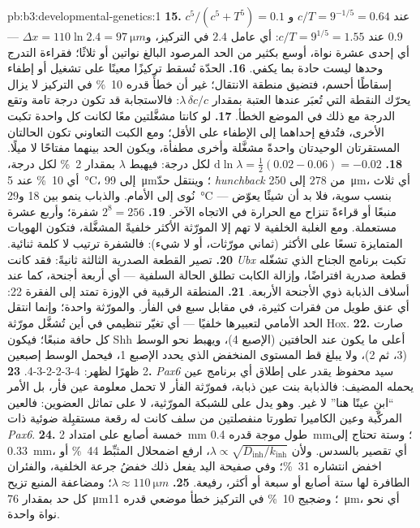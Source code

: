 \begin{solution}{pb:b3:developmental-genetics:1}
\textbf{15.} $c^{5}/(c^{5} + T^{5}) = 0.1$ عند $c/T = 9^{-1/5} = 0.64$ و
$0.9$ عند $c/T = 9^{1/5} = 1.55$: أي عامل $2.4$ في التركيز،
و$\Delta x = 110\ln 2.4 = \qty{97}{\micro m}$ --- أي إحدى عشرة نواة،
أوسع بكثير من الحد المرصود البالغ نواتين أو ثلاثًا؛ فقراءة
التدرج وحدها ليست حادة بما يكفي.
\textbf{16.} الحدّة تُسقط تركيزًا معينًا على تشغيل أو إطفاء
إسقاطًا أحسم، فتضيق منطقة الانتقال؛ غير أن خطأً قدره
\qty{10}{\%} في التركيز لا يزال يحرّك النقطة التي تُعبَر
عندها العتبة بمقدار $\lambda\,\delta c/c$: فالاستجابة قد تكون
درجة تامة وتقع الدرجة مع ذلك في الموضع الخطأ.
\textbf{17.} لو كانتا مشغَّلتين معًا لكانت كل واحدة تكبت
الأخرى، فتُدفع إحداهما إلى الإطفاء على الأقل؛ ومع الكبت
التعاوني تكون الحالتان المستقرتان الوحيدتان واحدةً مشغَّلة
وأخرى مطفأة، ويكون الحد بينهما مفتاحًا لا ميلًا.
\textbf{18.} $\mathrm{d}\ln\lambda = \tfrac{1}{2}(0.02 - 0.06) = -0.02$
لكل درجة: فيهبط $\lambda$ بمقدار \qty{2}{\%} لكل درجة، أي
\qty{10}{\%} عند \qty{5}{\celsius}، إلى \qty{99}{\micro m}؛ وينتقل
حدّ \emph{hunchback} من $278$ إلى \qty{250}{\micro m}، أي ثلاث
نُوى إلى الأمام. والذباب ينمو بين \qty{18}{} و\qty{29}{\celsius}
بنسب سوية، فلا بد أن شيئًا يعوّض --- منبعًا أو قراءةً تنزاح
مع الحرارة في الاتجاه الآخر.
\textbf{19.} $2^{8} = 256$ شفرة؛ وأربع عشرة مستعملة. ومع
الغلبة الخلفية لا تهم إلا المورّثة الأكثر خلفيةً المشغَّلة،
فتكون الهويات المتمايزة تسعًا على الأكثر (ثماني مورّثات، أو
لا شيء): فالشفرة ترتيب لا كلمة ثنائية.
\textbf{20.} تصير القطعة الصدرية الثالثة ثانيةً: فقد كانت
\emph{Ubx} تكبت برنامج الجناح الذي تشغّله قطعة صدرية
افتراضًا، وإزالة الكابت تطلق الحالة السلفية --- أي أربعة
أجنحة، كما عند أسلاف الذبابة ذوي الأجنحة الأربعة.
\textbf{21.} المنطقة الرقبية في الإوزة تمتد إلى الفقرة 22: أي
عنق طويل من فقرات كثيرة، في مقابل سبع في الفأر. والمورّثة
واحدة؛ وإنما انتقل الحد الأمامي لتعبيرها خلفيًا --- أي تغيّر
تنظيمي في أين تُشغَّل مورّثة Hox.
\textbf{22.} صارت كل حافة منبعًا؛ فيكون Shh أعلى ما يكون عند
الحافتين (الإصبع 4)، ويهبط نحو الوسط (3، ثم 2)، ولا يبلغ قط
المستوى المنخفض الذي يحدد الإصبع 1، فيحمل الوسط إصبعين 2
ظهرًا لظهر: 4-3-2-2-3-4.
\textbf{23.} \emph{Pax6}  سيد محفوظ يقدر على إطلاق أي
برنامج عين يحمله المضيف: فالذبابة بنت عين ذبابة، فمورّثة
الفأر لا تحمل معلومة عين فأر، بل الأمر ``ابنِ عينًا هنا'' لا
غير. وهو يدل على  للشبكة المورّثية، لا على تماثل
العضوين: فالعين المركّبة وعين الكاميرا تطورتا منفصلتين من
سلف كانت له رقعة مستقبِلة ضوئية ذات \emph{Pax6}.
\textbf{24.} خمسة أصابع على امتداد \qty{2}{mm} طول موجة قدره
\qty{0.4}{mm}؛ وستة تحتاج إلى \qty{0.33}{mm}، أي تقصير بالسدس.
ولأن $\lambda \propto \sqrt{D_{\text{inh}}/k_{\text{inh}}}$، ارفع
اضمحلال المثبِّط \qty{44}{\%} أو اخفض انتشاره \qty{31}{\%}؛ وفي
صفيحة اليد يفعل ذلك خفضُ جرعة  الخلفية، والفئران
الطافرة لها ستة أصابع أو سبعة أو أكثر، رفيعة.
\textbf{25.} $\lambda \approx \qty{110}{\micro m}$؛ ومضاعفة المنبع
تزيح كل حد بمقدار \qty{76}{\micro m}؛ وضجيج \qty{10}{\%} في
التركيز خطأ موضعي قدره \qty{11}{\micro m}، أي نحو نواة واحدة.
\end{solution}
